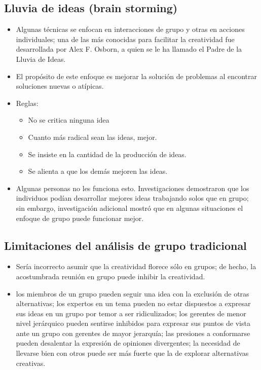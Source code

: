 \documentclass{article}
\begin{document}
\subsection{Lluvia de ideas (brain storming)}
\begin{itemize}
    \item Algunas técnicas se enfocan en interacciones de grupo y otras en acciones individuales; una de las más conocidas para facilitar la creatividad fue desarrollada por Alex F. Osborn, a quien se le ha llamado el Padre de la Lluvia de Ideas.
    \item El propósito de este enfoque es mejorar la solución de problemas al encontrar soluciones nuevas o atípicas.
    \item Reglas:
        \begin{itemize}
            \item No se critica ninguna idea 
            \item Cuanto más radical sean las ideas, mejor.
            \item Se insiste en la cantidad de la producción de ideas.
            \item Se alienta a que los demás mejoren las ideas.
        \end{itemize}
    
    \item Algunas personas no les funciona esto. Investigaciones demostraron que los individuos podían desarrollar mejores ideas trabajando solos que en grupo; sin embargo, investigación adicional mostró que en algunas situaciones el enfoque de grupo puede funcionar mejor.
\end{itemize}


\subsection{Limitaciones del análisis de grupo tradicional}
\begin{itemize}
    \item Sería incorrecto asumir que la  creatividad florece sólo en grupos; de hecho, la acostumbrada reunión en grupo puede inhibir  la creatividad.
    \item  los miembros de un grupo pueden seguir una idea con la exclusión de otras alternativas; los expertos en un tema pueden no estar dispuestos a expresar sus ideas en un grupo por temor a ser ridiculizados; los gerentes de menor nivel jerárquico pueden sentirse inhibidos para expresar sus puntos de vista ante un grupo con gerentes de mayor jerarquía; las presiones a conformarse pueden desalentar la expresión de opiniones divergentes; la necesidad de llevarse bien con otros puede ser más fuerte que la de explorar alternativas creativas.
\end{itemize}
\end{document}
